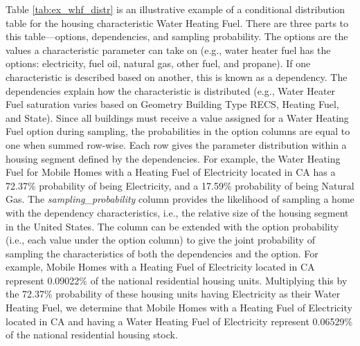 Table \ref{tab:ex_whf_distr} is an illustrative example of a conditional distribution table for the housing characteristic Water Heating Fuel. There are three parts to this table---options, dependencies, and sampling probability. The options are the values a characteristic parameter can take on (e.g., water heater fuel has the options: electricity, fuel oil, natural gas, other fuel, and propane). If one characteristic is described based on another, this is known as a dependency. The dependencies explain how the characteristic is distributed (e.g., Water Heater Fuel saturation varies based on Geometry Building Type RECS, Heating Fuel, and State). Since all buildings must receive a value assigned for a Water Heating Fuel option during sampling, the probabilities in the option columns are equal to one when summed row-wise. Each row gives the parameter distribution within a housing segment defined by the dependencies. For example, the Water Heating Fuel for Mobile Homes with a Heating Fuel of Electricity located in CA has a 72.37\% probability of being Electricity, and a 17.59\% probability of being Natural Gas.  The \textit{sampling\_probability} column provides the likelihood of sampling a home with the dependency characteristics, i.e., the relative size of the housing segment in the United States. The column can be extended with the option probability (i.e., each value under the option column) to give the joint probability of sampling the characteristics of both the dependencies and the option. For example, Mobile Homes with a Heating Fuel of Electricity located in CA represent 0.09022\% of the national residential housing units. Multiplying this by the 72.37\% probability of these housing units having Electricity as their Water Heating Fuel, we determine that Mobile Homes with a Heating Fuel of Electricity located in CA and having a Water Heating Fuel of Electricity represent 0.06529\% of the national residential housing stock.

